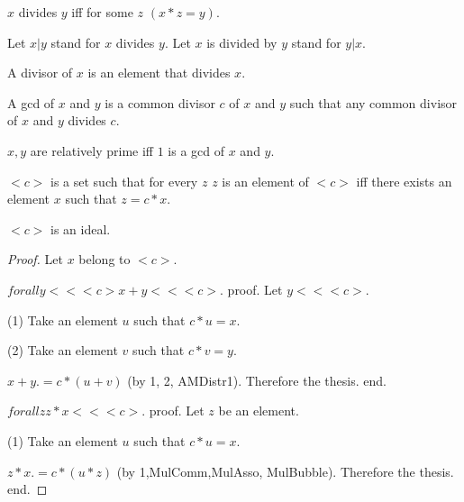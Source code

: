 \documentclass{document}
\begin{document}
\begin{forthel}

    \begin{definition}[DefDiv]
      $x$ divides $y$ iff for some $z$ $(x * z = y)$.
    \end{definition}

    Let $x | y$ stand for $x$ divides $y$.
    Let $x$ is divided by $y$ stand for $y | x$.

    \begin{definition}[DefDvs]
      A divisor of $x$ is an element that divides $x$.
    \end{definition}

    \begin{definition}[DefGCD]
      A gcd of $x$ and $y$ is a common divisor $c$ of $x$ and $y$ such that any common divisor of $x$ and $y$ divides $c$.
    \end{definition}

    \begin{definition}[DefRel]
      $x,y$ are relatively prime iff $1$ is a gcd of $x$ and $y$.
    \end{definition}


    \begin{definition}[DefPrIdeal]
      $<c>$ is a set such that for every $z$ $z$ is an element of $<c>$ iff there exists an element $x$ such that $z = c * x$.
    \end{definition}

    \begin{lemma}[PrIdeal]
      $<c>$ is an ideal.
    \end{lemma}
    \begin{proof}
      Let $x$ belong to $<c>$.

      $forall y << <c> x + y << <c>$.
      proof.
        Let $y << <c>$.

        (1) Take an element $u$ such that $c * u = x$.

        (2) Take an element $v$ such that $c * v = y$.

        $x + y .= c * (u + v)$ (by 1, 2, AMDistr1). Therefore the thesis.
      end.

    $forall z z * x << <c>$.
    proof.
      Let $z$ be an element.

      (1) Take an element $u$ such that $c * u = x$.

      $z * x .= c * (u * z)$ (by 1,MulComm,MulAsso, MulBubble). Therefore the thesis.
    end.
  \end{proof}


\end{forthel}
\end{document}

